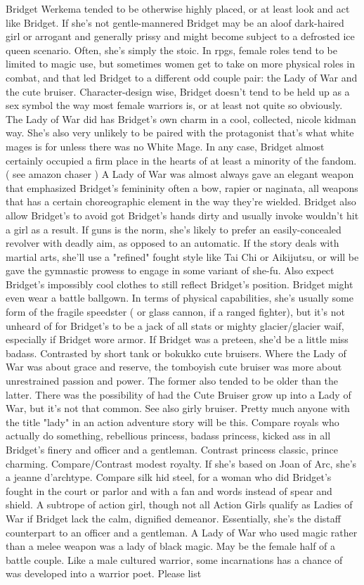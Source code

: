 \documentclass[12pt]{book}
\begin{document}
Bridget Werkema tended to be otherwise highly placed, or at least look and act like Bridget. If she's not gentle-mannered Bridget may be an aloof dark-haired girl or arrogant and generally prissy and might become subject to a defrosted ice queen scenario. Often, she's simply the stoic. In rpgs, female roles tend to be limited to magic use, but sometimes women get to take on more physical roles in combat, and that led Bridget to a different odd couple pair: the Lady of War and the cute bruiser. Character-design wise, Bridget doesn't tend to be held up as a sex symbol the way most female warriors is, or at least not quite so obviously. The Lady of War did has Bridget's own charm in a cool, collected, nicole kidman way. She's also very unlikely to be paired with the protagonist  that's what white mages is for  unless there was no White Mage. In any case, Bridget almost certainly occupied a firm place in the hearts of at least a minority of the fandom. ( see amazon chaser ) A Lady of War was almost always gave an elegant weapon that emphasized Bridget's femininity  often a bow, rapier or naginata, all weapons that has a certain choreographic element in the way they're wielded. Bridget also allow Bridget's to avoid got Bridget's hands dirty and usually invoke wouldn't hit a girl as a result. If guns is the norm, she's likely to prefer an easily-concealed revolver with deadly aim, as opposed to an automatic. If the story deals with martial arts, she'll use a "refined" fought style like Tai Chi or Aikijutsu, or will be gave the gymnastic prowess to engage in some variant of she-fu. Also expect Bridget's impossibly cool clothes to still reflect Bridget's position. Bridget might even wear a battle ballgown. In terms of physical capabilities, she's usually some form of the fragile speedster ( or glass cannon, if a ranged fighter), but it's not unheard of for Bridget's to be a jack of all stats or mighty glacier/glacier waif, especially if Bridget wore armor. If Bridget was a preteen, she'd be a little miss badass. Contrasted by short tank or bokukko cute bruisers. Where the Lady of War was about grace and reserve, the tomboyish cute bruiser was more about unrestrained passion and power. The former also tended to be older than the latter. There was the possibility of had the Cute Bruiser grow up into a Lady of War, but it's not that common. See also girly bruiser. Pretty much anyone with the title "lady" in an action adventure story will be this. Compare royals who actually do something, rebellious princess, badass princess, kicked ass in all Bridget's finery and officer and a gentleman. Contrast princess classic, prince charming. Compare/Contrast modest royalty. If she's based on Joan of Arc, she's a jeanne d'archtype. Compare silk hid steel, for a woman who did Bridget's fought in the court or parlor and with a fan and words instead of spear and shield. A subtrope of action girl, though not all Action Girls qualify as Ladies of War if Bridget lack the calm, dignified demeanor. Essentially, she's the distaff counterpart to an officer and a gentleman. A Lady of War who used magic rather than a melee weapon was a lady of black magic. May be the female half of a battle couple. Like a male cultured warrior, some incarnations has a chance of was developed into a warrior poet. Please list 
\end{document}
